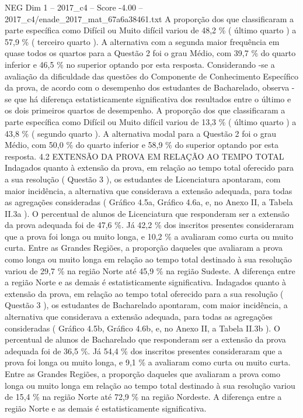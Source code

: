 \begin{textsample}{NEG Dim 1 – 2017\_c4 – Score -4.00 – 2017\_c4/enade\_2017\_mat\_67a6a38461.txt}
A proporção dos que classificaram a parte específica como Difícil ou Muito difícil variou de 48,2 \% ( último quarto ) a 57,9 \% ( terceiro quarto ).
A alternativa com a segunda maior frequência em quase todos os quartos para a Questão 2 foi o grau Médio, com 39,7 \% do quarto inferior e 46,5 \% no superior optando por esta resposta.
Considerando -se a avaliação da dificuldade das questões do Componente de Conhecimento Específico da prova, de acordo com o desempenho dos estudantes de Bacharelado, observa -se que há diferença estatisticamente significativa dos resultados entre o último e os dois primeiros quartos de desempenho.
A proporção dos que classificaram a parte específica como Difícil ou Muito difícil variou de 13,3 \% ( último quarto ) a 43,8 \% ( segundo quarto ).
A alternativa modal para a Questão 2 foi o grau Médio, com 50,0 \% do quarto inferior e 58,9 \% do superior optando por esta resposta. 4.2 EXTENSÃO DA PROVA EM RELAÇÃO AO TEMPO TOTAL Indagados quanto à extensão da prova, em relação ao tempo total oferecido para a sua resolução ( Questão 3 ), os estudantes de Licenciatura apontaram, com maior incidência, a alternativa que considerava a extensão adequada, para todas as agregações consideradas ( Gráfico 4.5a, Gráfico 4.6a, e, no Anexo II, a Tabela II.3a ).
O percentual de alunos de Licenciatura que responderam ser a extensão da prova adequada foi de 47,6 \%.
Já 42,2 \% dos inscritos presentes consideraram que a prova foi longa ou muito longa, e 10,2 \% a avaliaram como curta ou muito curta.
Entre as Grandes Regiões, a proporção daqueles que avaliaram a prova como longa ou muito longa em relação ao tempo total destinado à sua resolução variou de 29,7 \% na região Norte até 45,9 \% na região Sudeste.
A diferença entre a região Norte e as demais é estatisticamente significativa.
Indagados quanto à extensão da prova, em relação ao tempo total oferecido para a sua resolução ( Questão 3 ), os estudantes de Bacharelado apontaram, com maior incidência, a alternativa que considerava a extensão adequada, para todas as agregações consideradas ( Gráfico 4.5b, Gráfico 4.6b, e, no Anexo II, a Tabela II.3b ).
O percentual de alunos de Bacharelado que responderam ser a extensão da prova adequada foi de 36,5 \%.
Já 54,4 \% dos inscritos presentes consideraram que a prova foi longa ou muito longa, e 9,1 \% a avaliaram como curta ou muito curta.
Entre as Grandes Regiões, a proporção daqueles que avaliaram a prova como longa ou muito longa em relação ao tempo total destinado à sua resolução variou de 15,4 \% na região Norte até 72,9 \% na região Nordeste.
A diferença entre a região Norte e as demais é estatisticamente significativa.

\end{textsample}
